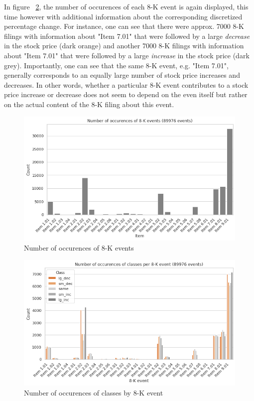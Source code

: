 \documentclass{article}
\begin{document}
	In figure ~\ref{fig:dist_class_by_8k}, the number of occurences of each 8-K event is again displayed, this time however with additional information about the corresponding discretized percentage change. For instance, one can see that there were approx. 7000 8-K filings with information about "Item 7.01" that were followed by a large \textit{decrease} in the stock price (dark orange) and another 7000 8-K filings with information about "Item 7.01" that were followed by a large \textit{increase} in the stock price (dark grey). Importantly, one can see that the same 8-K event, e.g. "Item 7.01", generally corresponds to an equally large number of stock price increases and decreases. In other words, whether a particular 8-K event contributes to a stock price increase or decrease does not seem to depend on the even itself but rather on the actual content of the 8-K filing about this event.
	

	\begin{figure}[h!]
		\includegraphics[width=\linewidth]{img/dist_8k_events.png}
		\caption{Number of occurences of 8-K events}
		\label{fig:dist_8k_events}
	\end{figure}


	\begin{figure}[h!]
		\includegraphics[width=\linewidth]{img/dist_class_by_8k.png}
		\caption{Number of occurences of classes by 8-K event}
		\label{fig:dist_class_by_8k}
	\end{figure}
\end{document}
